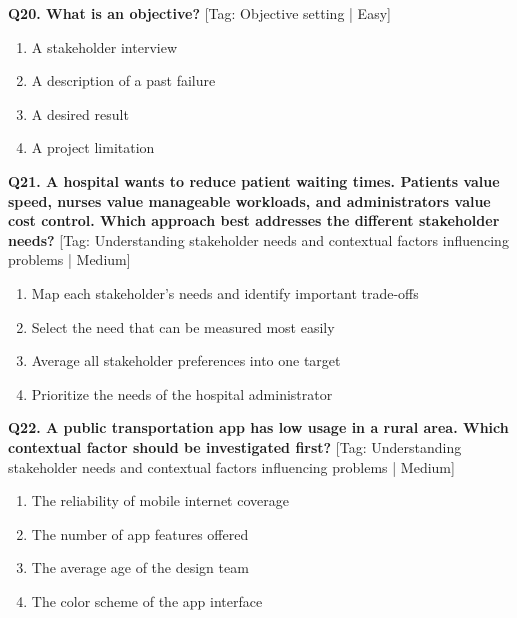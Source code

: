 \noindent\textbf{Q20. What is an objective?} \hfill [Tag: Objective setting | Easy]
\begin{enumerate}[label=(\alph*),topsep=2pt,itemsep=1pt,partopsep=0pt,parsep=0pt]
    \item {A stakeholder interview}
    \item {A description of a past failure}
    \item {A desired result}
    \item {A project limitation}
\end{enumerate}
\vspace{2mm}

\noindent\textbf{Q21. A hospital wants to reduce patient waiting times. Patients value speed, nurses value manageable workloads, and administrators value cost control. Which approach best addresses the different stakeholder needs?} \hfill [Tag: Understanding stakeholder needs and contextual factors influencing problems | Medium]
\begin{enumerate}[label=(\alph*),topsep=2pt,itemsep=1pt,partopsep=0pt,parsep=0pt]
    \item {Map each stakeholder's needs and identify important trade-offs}
    \item {Select the need that can be measured most easily}
    \item {Average all stakeholder preferences into one target}
    \item {Prioritize the needs of the hospital administrator}
\end{enumerate}
\vspace{2mm}

\noindent\textbf{Q22. A public transportation app has low usage in a rural area. Which contextual factor should be investigated first?} \hfill [Tag: Understanding stakeholder needs and contextual factors influencing problems | Medium]
\begin{enumerate}[label=(\alph*),topsep=2pt,itemsep=1pt,partopsep=0pt,parsep=0pt]
    \item {The reliability of mobile internet coverage}
    \item {The number of app features offered}
    \item {The average age of the design team}
    \item {The color scheme of the app interface}
\end{enumerate}
\vspace{2mm}

